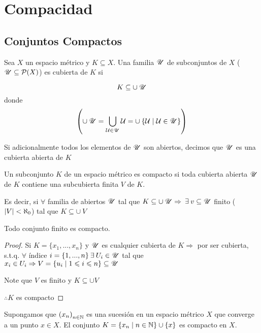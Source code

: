\chapter{Compacidad}

\section{Conjuntos Compactos}

\begin{definition}[Cubiertas]
    Sea $X$ un espacio métrico y $K \subseteq X$. Una familia $\mathscr{U}$ de subconjuntos de $X$ ($\mathscr{U} \subseteq \mathcal{P}(X)$) es cubierta de $K$ si

    $$K \subseteq \cup \: \mathscr{U}$$
    donde
    $$\left( \cup \: \mathscr{U} = \bigcup\limits_{\mathcal{U} \in \mathscr{U}} \mathcal{U} = \cup  \: \{ \mathcal{U} \mid \mathcal{U} \in \mathscr{U} \} \right)$$

    Si adicionalmente todos los elementos de $\mathscr{U}$ son abiertos, decimos que $\mathscr{U}$ es una cubierta abierta de $K$
\end{definition}

\begin{definition}
    Un subconjunto $K$ de un espacio métrico es compacto si toda cubierta abierta $\mathscr{U}$ de $K$ contiene una subcubierta finita $V$ de $K$.

    Es decir, si $\forall$ familia de abiertos $\mathscr{U}$ tal que $K \subseteq \cup \: \mathscr{U} \Rightarrow \: \exists \: v \subseteq \mathscr{U}$ finito ($\abs{V} < \aleph_0$) tal que $K \subseteq \cup \: V$
\end{definition}

\begin{theorem}
    Todo conjunto finito es compacto.
\end{theorem}

\begin{proof}
    Si $K = \{ x_1, ..., x_n \}$ y $\mathscr{U}$ es cualquier cubierta de $K \Rightarrow$ por ser cubierta, s.t.q. $\forall$ índice $i = \{ 1, ..., n \} \: \exists \: U_i \in \mathscr{U}$ tal que $x_i \in U_i \Rightarrow V = \{ u_i \mid 1 \leqslant i \leqslant n \} \subseteq \mathscr{U}$
    
    Note que $V$ es finito y $K \subseteq \cup V$

    $\therefore K$ es compacto
\end{proof}

\begin{eg}
    Supongamos que ${\left( x_n \right)}_{n \in \mathbb{N}}$ es una sucesión en un espacio métrico $X$ que converge a un punto $x \in X$. El conjunto $K = \{ x_n \mid n \in \mathbb{N} \} \cup \{ x\}$ es compacto en $X$.
\end{eg}

